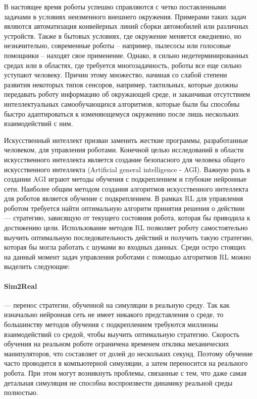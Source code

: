 В настоящее время роботы успешно справляются с четко поставленными задачами в условиях неизменного внешнего окружения. Примерами таких задач являются автоматизация конвейерных линий сборки автомобилей или различных устройств. Также в бытовых условиях, где окружение меняется ежедневно, но незначительно, современные роботы – например, пылесосы или голосовые помощники – находят свое применение. Однако, в сильно недетерминированных средах или в областях, где требуется многозадачность, роботы все еще сильно уступают человеку. Причин этому множество, начиная со слабой степени развития некоторых типов сенсоров, например, тактильных, которые должны передавать роботу информацию об окружающей среде, и заканчивая отсутствием интеллектуальных самообучающихся алгоритмов, которые были бы способны быстро адаптироваться к изменяющемуся окружению после лишь нескольких взаимодействий с ним. 

Искусственный интеллект призван заменить жесткие программы, разработанные человеком, для управления роботами. Конечной целью исследований в области искусственного интеллекта является создание безопасного для человека общего искусственного интеллекта (Artificial general intelligence - AGI). Важную роль в создании AGI играют методы обучения с подкреплением и глубокие нейронные сети. 
Наиболее общим методом создания алгоритмов искусственного интеллекта для роботов является обучение с подкреплением. В рамках RL для управления роботом требуется найти оптимальную алгоритм принятия решения о действии –-- стратегию, зависящую от текущего состояния робота, которая бы приводила к достижению цели. Использование методов RL позволяет роботу самостоятельно выучить оптимальную последовательность действий и получить такую стратегию, которая бы могла работать с шумами во входных данных. Среди остро стоящих на данный момент задач управления роботами с помощью алгоритмов RL можно выделить следующие:

\paragraph{Sim2Real} --- перенос стратегии, обученной на симуляции в реальную среду. Так как изначально нейронная сеть не имеет никакого представления о среде, то большинству методов обучения с подкреплением требуются миллионы взаимодействий со средой, чтобы выучить оптимальную стратегию. Скорость обучения на реальном роботе ограничена временем отклика механических манипуляторов, что составляет от долей до нескольких секунд. Поэтому обучение часто проводится в компьютерной симуляции, а затем переносится на реального робота. При этом могут возникнуть проблемы, связанные с тем, что даже самая детальная симуляция не способна воспроизвести динамику реальной среды полностью. 

